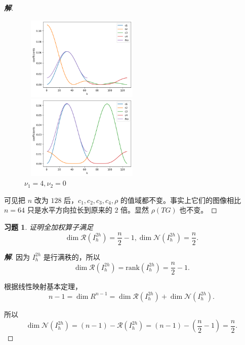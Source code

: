 \documentclass{ctexart}
\newtheorem{ex}{习题}
\newenvironment{sol}{\begin{proof}[\bf 解]}{\end{proof}}
\begin{document}
\begin{sol}
\begin{figure}[htbp]
    \begin{minipage}{6cm}
        \centering
        \includegraphics[width = 6cm, height = 4cm]{41-11.png}
        \caption{$\nu_1=2,\nu_2=2$}
        \label{9.41-fig11}
    \end{minipage}
    \qquad
    \begin{minipage}{6cm}
        \centering
        \includegraphics[width = 6cm, height = 4cm]{41-12.png}
        \caption{$\nu_1=4,\nu_2=0$}
        \label{9.41-fig12}
    \end{minipage}
\end{figure}

可见把 $n$ 改为 $128$ 后，$c_1,c_2,c_3,c_4,\rho$ 的值域都不变。事实上它们的图像相比 $n=64$ 只是水平方向拉长到原来的 $2$ 倍。显然 $\rho(TG)$ 也不变。

\end{sol}

\begin{ex}
    证明全加权算子满足
    \begin{equation}
        \dim \mathcal{R}(I_h^{2h}) = \dfrac n2-1,\dim \mathcal{N}(I_h^{2h}) = \dfrac n2.
    \end{equation}
\end{ex}

\begin{sol}
    因为 $I_h^{2h}$ 是行满秩的，所以
    \begin{equation}
        \dim \mathcal{R}(I_h^{2h}) = \mathrm{rank}(I_h^{2h}) = \dfrac n2-1.
    \end{equation}
    
    根据线性映射基本定理，
    \begin{equation}
        n-1 = \dim R^{n-1} = \dim \mathcal{R}(I_h^{2h}) + \dim \mathcal{N}(I_h^{2h}).
    \end{equation}

    所以
    \begin{equation}
        \dim \mathcal{N}(I_h^{2h}) = (n-1) - \mathcal{R}(I_h^{2h}) = (n-1) - (\dfrac n2-1) = \dfrac n2.
    \end{equation}
\end{sol}
\end{document}
